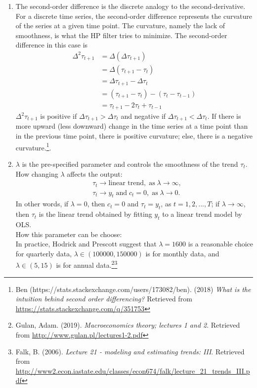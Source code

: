 \documentclass[10pt]{article}
\begin{document}
\begin{enumerate}[1)]
\item
The second-order difference is the discrete analogy to the second-derivative. For a discrete time series, the second-order difference represents the curvature of the series at a given time point. The curvature, namely the lack of smoothness, is what the HP filter tries to minimize. The second-order difference in this case is
\begin{align*}
\Delta^2\tau_{t+1}&=\Delta(\Delta\tau_{t+1})\\
&=\Delta(\tau_{t+1}-\tau_{t})\\
&=\Delta\tau_{t+1}-\Delta\tau_{t}\\
&=(\tau_{t+1}-\tau_t)-(\tau_t-\tau_{t-1})\\
&=\tau_{t+1}-2\tau_t+\tau_{t-1}
\end{align*}
$\Delta^2\tau_{t+1}$ is positive if $\Delta\tau_{t+1}>\Delta\tau_{t}$ and negative if $\Delta\tau_{t+1}<\Delta\tau_{t}$. If there is more upward (less downward) change in the time series at a time point than in the previous time point, there is positive curvature; else, there is a negative curvature.\footnote{ Ben (https://stats.stackexchange.com/users/173082/ben). (2018) \textit{What is the intuition behind second order differencing?} Retrieved from \url{https://stats.stackexchange.com/q/351753}}. %
\vspace{3mm}

\item
$\lambda$ is the pre-specified parameter and controls the smoothness of the trend $\tau_t$.\\
How changing $\lambda$ affects the output:
\begin{align*}
&\tau_t\rightarrow\textrm{linear trend},\;\textrm{as}\;\lambda\rightarrow\infty,\\
&\tau_t\rightarrow{y_t}\;\textrm{and}\;c_t=0,\;\textrm{as}\;\lambda\rightarrow0.
\end{align*}
In other words, if $\lambda=0$, then $c_t=0$ and $\tau_t=y_t$, as $t=1,2,...,T$; if $\lambda\rightarrow\infty$, then $\tau_t$ is the linear trend obtained by fitting $y_t$ to a linear trend model by OLS.\\
How this parameter can be choose:\\
In practice, Hodrick and Prescott suggest that $\lambda=1600$ is a reasonable choice for quarterly data, $\lambda\in(100000,150000)$ is for monthly data, and $\lambda\in(5,15)$ is for annual data.\footnote{ Gulan, Adam. (2019). \textit{Macroeconomics theory; lectures 1 and 2}. Retrieved from \url{http://www.gulan.pl/lectures1-2.pdf}}\footnote{ Falk, B. (2006). \textit{Lecture 21 - modeling and estimating trends: III}. Retrieved from \url{http://www2.econ.iastate.edu/classes/econ674/falk/lecture_21_trends_III.pdf}}
\vspace{3mm}


\end{enumerate}
\end{document}
